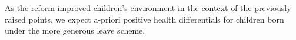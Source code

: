 \documentclass[11pt, a4paper]{article} %
\begin{document}
As the reform improved children's environment in the context of the previously raised points, we expect a-priori positive health differentials for children born under the more generous leave scheme.




















\bigskip
\end{document}
